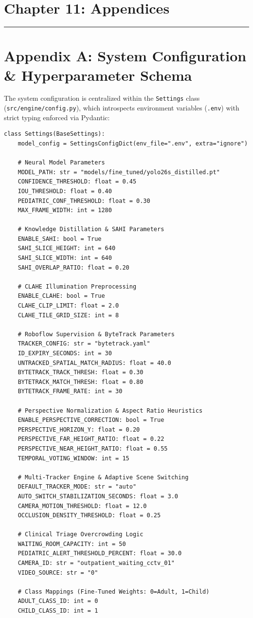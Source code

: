\section{Chapter 11: Appendices}\label{chapter-11-appendices}

\begin{center}\rule{0.5\linewidth}{0.5pt}\end{center}

\section{Appendix A: System Configuration \& Hyperparameter
Schema}\label{appendix-a-system-configuration-hyperparameter-schema}

The system configuration is centralized within the \texttt{Settings}
class (\texttt{src/engine/config.py}), which introspects environment
variables (\texttt{.env}) with strict typing enforced via Pydantic:

\begin{verbatim}
class Settings(BaseSettings):
    model_config = SettingsConfigDict(env_file=".env", extra="ignore")

    # Neural Model Parameters
    MODEL_PATH: str = "models/fine_tuned/yolo26s_distilled.pt"
    CONFIDENCE_THRESHOLD: float = 0.45
    IOU_THRESHOLD: float = 0.40
    PEDIATRIC_CONF_THRESHOLD: float = 0.30
    MAX_FRAME_WIDTH: int = 1280

    # Knowledge Distillation & SAHI Parameters
    ENABLE_SAHI: bool = True
    SAHI_SLICE_HEIGHT: int = 640
    SAHI_SLICE_WIDTH: int = 640
    SAHI_OVERLAP_RATIO: float = 0.20

    # CLAHE Illumination Preprocessing
    ENABLE_CLAHE: bool = True
    CLAHE_CLIP_LIMIT: float = 2.0
    CLAHE_TILE_GRID_SIZE: int = 8

    # Roboflow Supervision & ByteTrack Parameters
    TRACKER_CONFIG: str = "bytetrack.yaml"
    ID_EXPIRY_SECONDS: int = 30
    UNTRACKED_SPATIAL_MATCH_RADIUS: float = 40.0
    BYTETRACK_TRACK_THRESH: float = 0.30
    BYTETRACK_MATCH_THRESH: float = 0.80
    BYTETRACK_FRAME_RATE: int = 30

    # Perspective Normalization & Aspect Ratio Heuristics
    ENABLE_PERSPECTIVE_CORRECTION: bool = True
    PERSPECTIVE_HORIZON_Y: float = 0.20
    PERSPECTIVE_FAR_HEIGHT_RATIO: float = 0.22
    PERSPECTIVE_NEAR_HEIGHT_RATIO: float = 0.55
    TEMPORAL_VOTING_WINDOW: int = 15

    # Multi-Tracker Engine & Adaptive Scene Switching
    DEFAULT_TRACKER_MODE: str = "auto"
    AUTO_SWITCH_STABILIZATION_SECONDS: float = 3.0
    CAMERA_MOTION_THRESHOLD: float = 12.0
    OCCLUSION_DENSITY_THRESHOLD: float = 0.25

    # Clinical Triage Overcrowding Logic
    WAITING_ROOM_CAPACITY: int = 50
    PEDIATRIC_ALERT_THRESHOLD_PERCENT: float = 30.0
    CAMERA_ID: str = "outpatient_waiting_cctv_01"
    VIDEO_SOURCE: str = "0"

    # Class Mappings (Fine-Tuned Weights: 0=Adult, 1=Child)
    ADULT_CLASS_ID: int = 0
    CHILD_CLASS_ID: int = 1
\end{verbatim}


